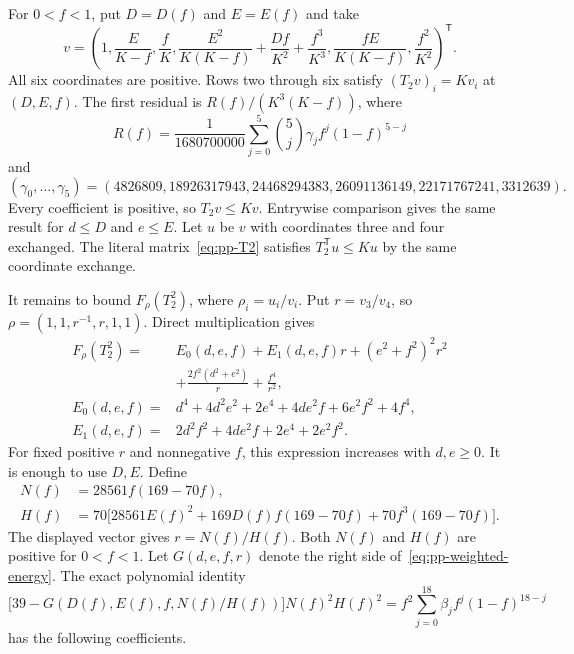 \documentclass[11pt,a4paper]{article}
\theoremstyle{definition}
\theoremstyle{remark}
\newcommand{\T}{\mathsf{T}}
\begin{document}
For $0<f<1$, put $D=D(f)$ and $E=E(f)$ and take
\[
v=\left(1,\frac{E}{K-f},\frac fK,
\frac{E^2}{K(K-f)}+\frac{Df}{K^2}+\frac{f^3}{K^3},
\frac{fE}{K(K-f)},\frac{f^2}{K^2}\right)^\T.
\]
All six coordinates are positive.
Rows two through six satisfy $(T_2v)_i=Kv_i$ at $(D,E,f)$.
The first residual is $R(f)/(K^3(K-f))$, where
\[
R(f)=\frac1{1680700000}
\sum_{j=0}^5\binom5j\gamma_j f^j(1-f)^{5-j}
\]
and
\[
(\gamma_0,\ldots,\gamma_5)=
(4826809,18926317943,24468294383,26091136149,22171767241,3312639).
\]
Every coefficient is positive, so $T_2v\le Kv$.
Entrywise comparison gives the same result for $d\le D$ and $e\le E$.
Let $u$ be $v$ with coordinates three and four exchanged.
The literal matrix~\eqref{eq:pp-T2} satisfies
$T_2^\T u\le Ku$ by the same coordinate exchange.

It remains to bound $F_\rho(T_2^2)$, where $\rho_i=u_i/v_i$.
Put $r=v_3/v_4$, so
$\rho=(1,1,r^{-1},r,1,1)$.
Direct multiplication gives
\begin{equation}\label{eq:pp-weighted-energy}
\begin{aligned}
F_\rho(T_2^2)={}&E_0(d,e,f)+E_1(d,e,f)r+(e^2+f^2)^2r^2\\
&+\frac{2f^2(d^2+e^2)}r+\frac{f^4}{r^2},\\
E_0(d,e,f)={}&d^4+4d^2e^2+2e^4+4de^2f+6e^2f^2+4f^4,\\
E_1(d,e,f)={}&2d^2f^2+4de^2f+2e^4+2e^2f^2.
\end{aligned}
\end{equation}
For fixed positive $r$ and nonnegative $f$, this expression increases with $d,e\ge0$.
It is enough to use $D,E$.
Define
\[
\begin{aligned}
N(f)&=28561f(169-70f),\\
H(f)&=70\bigl[28561E(f)^2+169D(f)f(169-70f)
                    +70f^3(169-70f)\bigr].
\end{aligned}
\]
The displayed vector gives $r=N(f)/H(f)$.
Both $N(f)$ and $H(f)$ are positive for $0<f<1$.
Let $G(d,e,f,r)$ denote the right side of~\eqref{eq:pp-weighted-energy}.
The exact polynomial identity
\begin{equation}\label{eq:pp-energy-certificate}
\bigl[39-G(D(f),E(f),f,N(f)/H(f))\bigr]N(f)^2H(f)^2
=f^2\sum_{j=0}^{18}\beta_jf^j(1-f)^{18-j}
\end{equation}
has the following coefficients.
\end{document}
